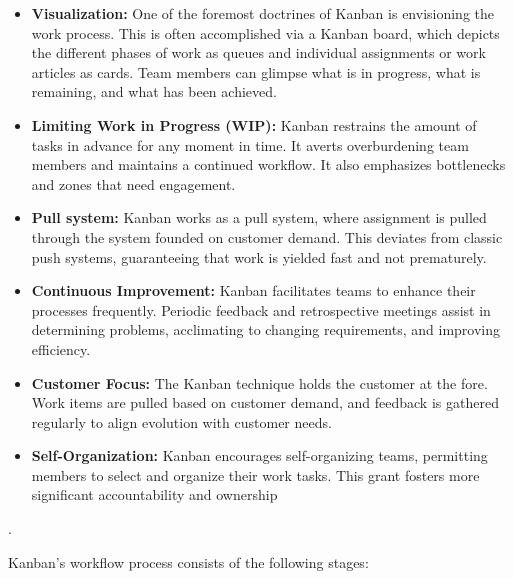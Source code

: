 \documentclass[conference]{IEEEtran}
\begin{document}
\begin{itemize}
\item \textbf{Visualization:} One of the foremost doctrines of Kanban is envisioning the work process. This is often accomplished via a Kanban board, which depicts the different phases of work as queues and individual assignments or work articles as cards. Team members can glimpse what is in progress, what is remaining, and what has been achieved\cite{ikonen2010leadership}\cite{ikonen2011impact}.

\item \textbf{Limiting Work in Progress (WIP):} Kanban restrains the amount of tasks in advance for any moment in time. It averts overburdening team members and maintains a continued workflow. It also emphasizes bottlenecks and zones that need engagement\cite{ikonen2010leadership}.

\item \textbf{Pull system:} Kanban works as a pull system, where assignment is pulled through the system founded on customer demand. This deviates from classic push systems, guaranteeing that work is yielded fast and not prematurely\cite{ikonen2011impact}.

\item \textbf{Continuous Improvement:} Kanban facilitates teams to enhance their processes frequently. Periodic feedback and retrospective meetings assist in determining problems, acclimating to changing requirements, and improving efficiency\cite{ikonen2011impact}.

\item \textbf{Customer Focus:} The Kanban technique holds the customer at the fore. Work items are pulled based on customer demand, and feedback is gathered regularly to align evolution with customer needs\cite{al2015kanban}.

\item \textbf{Self-Organization:} Kanban encourages self-organizing teams, permitting members to select and organize their work tasks. This grant fosters more significant accountability and ownership\cite{corona2013review}
\end{itemize}.


Kanban's workflow process consists of the following stages:
\end{document}
